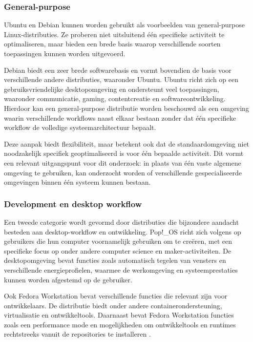 \documentclass{hogent-article}
\begin{document}
\subsubsection{General-purpose}
\label{sssec:generalpurpose}

Ubuntu en Debian kunnen worden gebruikt als voorbeelden van general-purpose Linux-distributies. Ze proberen niet uitsluitend één specifieke activiteit te optimaliseren, maar bieden een brede basis waarop verschillende soorten toepassingen kunnen worden uitgevoerd.

Debian biedt een zeer brede softwarebasis en vormt bovendien de basis voor verschillende andere distributies, waaronder Ubuntu. Ubuntu richt zich op een gebruiksvriendelijke desktopomgeving en ondersteunt veel toepassingen, waaronder communicatie, gaming, contentcreatie en softwareontwikkeling. Hierdoor kan een general-purpose distributie worden beschouwd als een omgeving waarin verschillende workflows naast elkaar bestaan zonder dat één specifieke workflow de volledige systeemarchitectuur bepaalt.

Deze aanpak biedt flexibiliteit, maar betekent ook dat de standaardomgeving niet noodzakelijk specifiek geoptimaliseerd is voor één bepaalde activiteit. Dit vormt een relevant uitgangspunt voor dit onderzoek: in plaats van één vaste algemene omgeving te gebruiken, kan onderzocht worden of verschillende gespecialiseerde omgevingen binnen één systeem kunnen bestaan.

\subsubsection{Development en desktop workflow}
\label{sssec:development}

Een tweede categorie wordt gevormd door distributies die bijzondere aandacht besteden aan desktop-workflow en ontwikkeling. Pop!\_OS richt zich volgens \textcite{System76} op gebruikers die hun computer voornamelijk gebruiken om te creëren, met een specifieke focus op onder andere computer science en maker-activiteiten. De desktopomgeving bevat functies zoals automatisch tegelen van vensters en verschillende energieprofielen, waarmee de werkomgeving en systeemprestaties kunnen worden afgestemd op de gebruiker.

Ook Fedora Workstation bevat verschillende functies die relevant zijn voor ontwikkelaars. De distributie biedt onder andere containerondersteuning, virtualisatie en ontwikkeltools. Daarnaast bevat Fedora Workstation functies zoals een performance mode en mogelijkheden om ontwikkeltools en runtimes rechtstreeks vanuit de repositories te installeren \autocite{Fedora}.
\end{document}
